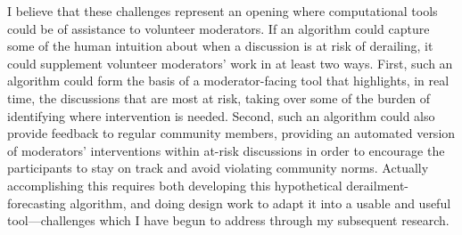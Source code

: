 \documentclass[11pt,letterpaper]{article}
\begin{document}
I believe that these challenges represent an opening where computational tools could be of assistance to volunteer moderators.
If an algorithm could capture some of the human intuition about when a discussion is at risk of derailing, it could supplement volunteer moderators' work in at least two ways.
First, such an algorithm could form the basis of a moderator-facing tool that highlights, in real time, the discussions that are most at risk, taking over some of the burden of identifying where intervention is needed.
Second, such an algorithm could also provide feedback to regular community members, providing an automated version of moderators' interventions within at-risk discussions in order to encourage the participants to stay on track and avoid violating community norms.
Actually accomplishing this requires both developing this hypothetical derailment-forecasting algorithm, and doing design work to adapt it into a usable and useful tool---challenges which I have begun to address through my subsequent research.

\vspace{\baselineskip}


\end{document}
